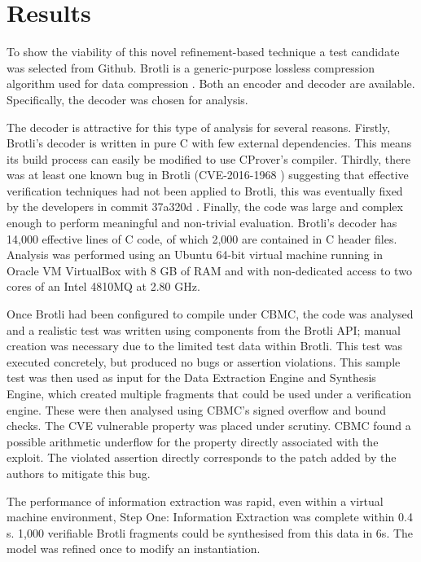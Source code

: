 \documentclass[EPiC]{easychair}
\begin{document}
\section{Results}
\label{sec:results}

To show the viability of this novel refinement-based technique a test candidate was selected from Github.  Brotli is a generic-purpose lossless compression algorithm  used for data compression \cite{BrotliDraft}.  Both an encoder and decoder are available.   Specifically, the decoder was chosen for analysis.

The decoder is attractive for this type of analysis for several reasons. Firstly, Brotli's decoder is written in pure C with few external dependencies.  This means its build process can easily be modified to use CProver's compiler.  Thirdly, there was at least one known bug in Brotli (CVE-2016-1968 \cite{CVE-2016-1968}) suggesting that effective verification techniques had not been applied to Brotli, this was eventually fixed by the developers in commit 37a320d \cite{Brotli}.  Finally, the code was large and complex enough to perform meaningful and non-trivial evaluation.  Brotli's decoder has 14,000 effective lines of C code, of which 2,000 are contained in C header files.  Analysis was performed using an Ubuntu  64-bit virtual machine running in Oracle VM VirtualBox with 8 GB of RAM and with non-dedicated access to two cores of an Intel 4810MQ at 2.80 GHz.

Once Brotli had been configured to compile under CBMC, the code was analysed and a realistic test was written using components from the Brotli API; manual creation was necessary due to the limited test data within Brotli.  This test was executed concretely, but produced no bugs or assertion violations.  This sample test was then used as input for the Data Extraction Engine and Synthesis Engine, which created multiple fragments that could be used under a verification engine.  These were then analysed using CBMC's signed overflow and bound checks.  The CVE vulnerable property was placed under scrutiny.  CBMC found a possible arithmetic underflow for the property directly associated with the exploit.  The violated assertion directly corresponds to the patch added by the authors to mitigate this bug.  

The performance of information extraction was rapid, even within a virtual machine environment, Step One: Information Extraction was complete within 0.4 s.  1,000 verifiable Brotli fragments could be synthesised from this data in 6s.  The model was refined once to modify an instantiation.  
\end{document}
